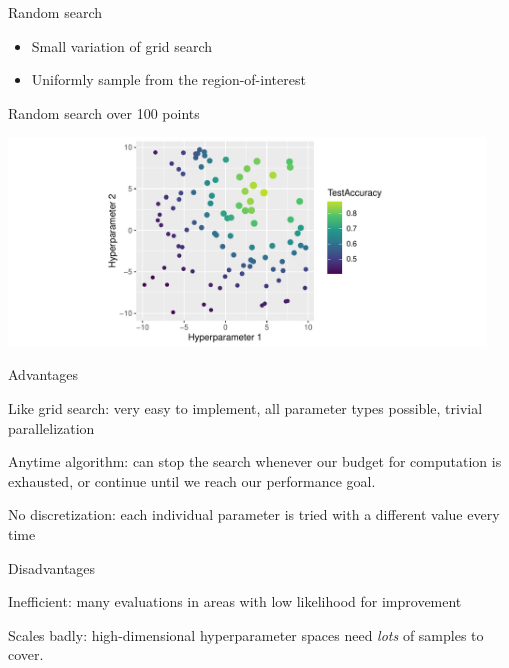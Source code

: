 \begin{vbframe}{Random search}

\begin{itemize}
\item Small variation of grid search
\item Uniformly sample from the region-of-interest
\end{itemize}


\begin{footnotesize}
\begin{center}
Random search over 100 points
\end{center}
\end{footnotesize}

\begin{knitrout}\scriptsize
{}\color{fgcolor}

{\centering \includegraphics[width=0.95\textwidth]{figure/cart_tuning_balgos_2} 
}


\end{knitrout}

\framebreak

\begin{blocki}{Advantages}
\item Like grid search: very easy to implement, all parameter types possible, trivial parallelization
\item Anytime algorithm: can stop the search whenever our budget for computation is exhausted, or continue until we reach our performance goal.
\item No discretization: each individual parameter is tried with a different value every time
\end{blocki}
\vspace{-2ex}
\begin{blocki}{Disadvantages}
\item Inefficient: many evaluations in areas with low likelihood for improvement
\item Scales badly: high-dimensional hyperparameter spaces need \emph{lots} of samples to cover.
\end{blocki}
\end{vbframe}

